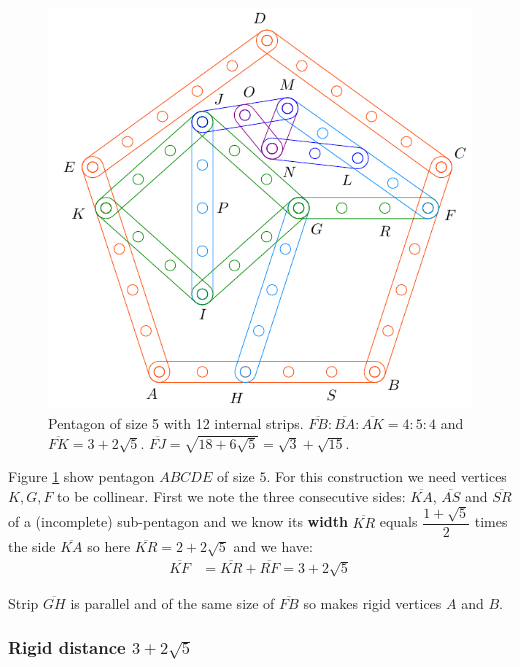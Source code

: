 \documentclass[11pt]{article}
\begin{document}
\begin{figure}[H]
\centering
\includegraphics[scale=0.9]{5/penta5-12a}
\caption{Pentagon of size 5 with 12 internal strips. $\overline{FB} : \overline{BA} : \overline{AK} = 4:5:4$ and $\overline{FK} = 3 + 2\sqrt5$. $\overline{FJ} = \sqrt{18+6\sqrt5} = \sqrt3 + \sqrt{15}$.}
\label{fig:penta5-12a}
\end{figure}

Figure \ref{fig:penta5-12a} show pentagon $ABCDE$ of size $5$. For this construction we need vertices $K,G,F$ to be collinear. First we note the three consecutive sides: $\overline{KA}$, $\overline{AS}$ and $\overline{SR}$ of a (incomplete) sub-pentagon and we know its \textbf{width} $\overline{KR}$ equals $\dfrac{1+\sqrt5}2$ times the side $\overline{KA}$ so here $\overline{KR} = 2 + 2\sqrt5$ and we have:
\begin{align}
\overline{KF} &= \overline{KR} + \overline{RF} = 3 + 2\sqrt5
\end{align}

Strip $\overline{GH}$ is parallel and of the same size of $\overline{FB}$ so makes rigid vertices $A$ and $B$.

\subsubsection{Rigid distance $3+2\sqrt5$}
\end{document}
